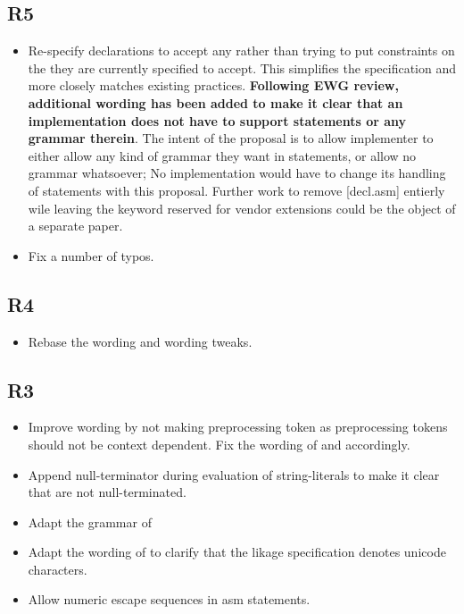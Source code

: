 \documentclass{wg21}
\begin{document}
\subsection{R5}
\begin{itemize}
\item Re-specify  declarations to accept any  rather than trying to put constraints on the
 they are currently specified to accept. This simplifies the specification and more closely matches existing practices.
\textbf{Following EWG review, additional wording has been added to make it clear that an implementation does not have to support  statements or any grammar therein}.
The intent of the proposal is to allow implementer to either allow any kind of grammar they want in  statements, or allow no grammar whatsoever; No implementation would have to
change its handling of  statements with this proposal.
Further work to remove [decl.asm] entierly wile leaving the  keyword reserved for vendor extensions could be the object of a separate paper.

\item Fix a number of typos.
\end{itemize}

\subsection{R4}
\begin{itemize}
    \item Rebase the wording and wording tweaks.
\end{itemize}

\subsection{R3}
\begin{itemize}
    \item Improve wording by not making  preprocessing token as preprocessing tokens should not be context dependent. Fix the wording of  and  accordingly.
    \item Append null-terminator during evaluation of string-literals to make it clear that  are not null-terminated.
    \item Adapt the grammar of 
    \item Adapt the wording of  to clarify that the likage specification denotes unicode characters.
    \item Allow numeric escape sequences in asm statements.
\end{itemize}
\end{document}
